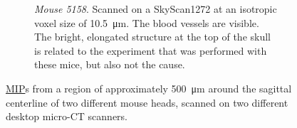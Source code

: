 \documentclass[a4paper]{exam}
\newlength\imagewidth%
\newlength\imagescale%
\newcommand{\mct}{micro-CT\xspace}%
\begin{document}
\begin{questions}
\begin{figure}[h]
\begin{subfigure}[t]{0.5\linewidth}
%
      \caption{\emph{Mouse 5158}.
        Scanned on a SkyScan1272 at an isotropic voxel size of \qty{10.5}{\micro\meter}.
        The blood vessels are visible.
        The bright, elongated structure at the top of the skull is related to the experiment that was performed with these mice, but also not the cause.}%
      \label{fig:5158}%
    \end{subfigure}
    \caption{\href{https://en.wikipedia.org/wiki/Maximum_intensity_projection}{MIP}s from a region of approximately \qty{500}{\micro\meter} around the sagittal centerline of two different mouse heads, scanned on two different desktop \mct{} scanners.}
  \end{figure}

\end{questions}
\end{document}
